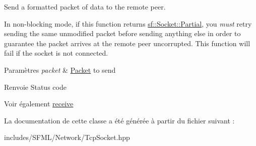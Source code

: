 Send a formatted packet of data to the remote peer. 

In non-\/blocking mode, if this function returns \hyperlink{classsf_1_1Socket_a51bf0fd51057b98a10fbb866246176dca181c163fad2eaea927185d127c392706}{sf\+::\+Socket\+::\+Partial}, you {\itshape must} retry sending the same unmodified packet before sending anything else in order to guarantee the packet arrives at the remote peer uncorrupted. This function will fail if the socket is not connected.


\begin{DoxyParams}{Paramètres}
{\em packet} & \hyperlink{classsf_1_1Packet}{Packet} to send\\
\hline
\end{DoxyParams}
\begin{DoxyReturn}{Renvoie}
Status code
\end{DoxyReturn}
\begin{DoxySeeAlso}{Voir également}
\hyperlink{classsf_1_1TcpSocket_a90ce50811ea61d4f00efc62bb99ae1af}{receive} 
\end{DoxySeeAlso}


La documentation de cette classe a été générée à partir du fichier suivant \+:\begin{DoxyCompactItemize}
\item 
includes/\+S\+F\+M\+L/\+Network/Tcp\+Socket.\+hpp\end{DoxyCompactItemize}

